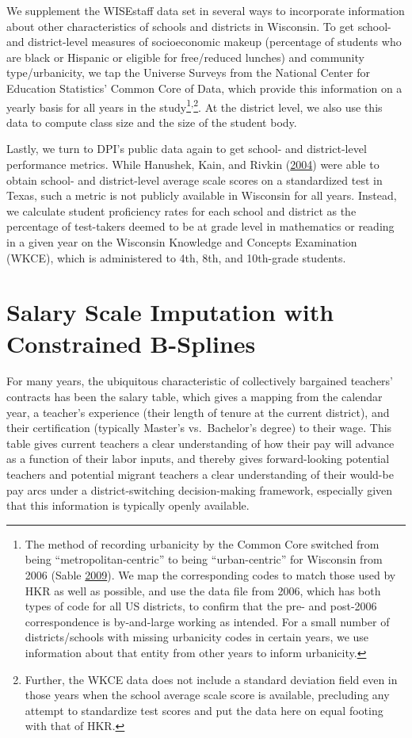 \documentclass[12pt,]{article}
\let\rmarkdownfootnote\footnote%
\def\footnote{\protect\rmarkdownfootnote}
\begin{document}
We supplement the WISEstaff data set in several ways to incorporate
information about other characteristics of schools and districts in
Wisconsin. To get school- and district-level measures of socioeconomic
makeup (percentage of students who are black or Hispanic or eligible for
free/reduced lunches) and community type/urbanicity, we tap the Universe
Surveys from the National Center for Education Statistics' Common Core
of Data, which provide this information on a yearly basis for all years
in the study\footnote{The method of recording urbanicity by the Common
  Core switched from being ``metropolitan-centric'' to being
  ``urban-centric'' for Wisconsin from 2006 (Sable
  \protect\hyperlink{ref-sable}{2009}). We map the corresponding codes
  to match those used by HKR as well as possible, and use the data file
  from 2006, which has both types of code for all US districts, to
  confirm that the pre- and post-2006 correspondence is by-and-large
  working as intended. For a small number of districts/schools with
  missing urbanicity codes in certain years, we use information about
  that entity from other years to inform urbanicity.}\textsuperscript{,}\footnote{Further,
  the WKCE data does not include a standard deviation field even in
  those years when the school average scale score is available,
  precluding any attempt to standardize test scores and put the data
  here on equal footing with that of HKR.}. At the district level, we
also use this data to compute class size and the size of the student
body.

Lastly, we turn to DPI's public data again to get school- and
district-level performance metrics. While Hanushek, Kain, and Rivkin
(\protect\hyperlink{ref-hanushek}{2004}) were able to obtain school- and
district-level average scale scores on a standardized test in Texas,
such a metric is not publicly available in Wisconsin for all years.
Instead, we calculate student proficiency rates for each school and
district as the percentage of test-takers deemed to be at grade level in
mathematics or reading in a given year on the Wisconsin Knowledge and
Concepts Examination (WKCE), which is administered to 4th, 8th, and
10th-grade students.

\section{Salary Scale Imputation with Constrained
B-Splines}\label{salary-scale-imputation-with-constrained-b-splines}

For many years, the ubiquitous characteristic of collectively bargained
teachers' contracts has been the salary table, which gives a mapping
from the calendar year, a teacher's experience (their length of tenure
at the current district), and their certification (typically Master's
vs.~Bachelor's degree) to their wage. This table gives current teachers
a clear understanding of how their pay will advance as a function of
their labor inputs, and thereby gives forward-looking potential teachers
and potential migrant teachers a clear understanding of their would-be
pay arcs under a district-switching decision-making framework,
especially given that this information is typically openly available.
\end{document}
